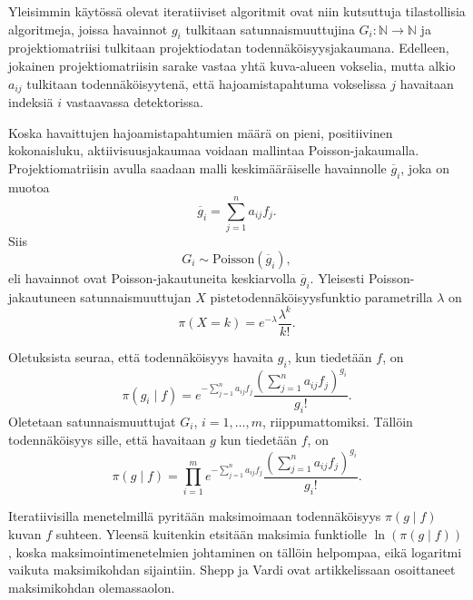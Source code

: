 Yleisimmin käytössä olevat iteratiiviset algoritmit ovat niin kutsuttuja tilastollisia algoritmeja, joissa havainnot $g_i$ tulkitaan satunnaismuuttujina $G_i\colon\mathbb{N}\to\mathbb{N}$\cite{wettenhovi_omegaopen-source_2021, kaipio_statistical_2005} ja projektiomatriisi tulkitaan projektiodatan todennäköisyysjakaumana\cite{boudjelal_novel_2021}. Edelleen, jokainen projektiomatriisin sarake vastaa yhtä kuva-alueen vokselia, mutta alkio $a_{ij}$ tulkitaan todennäköisyytenä, että hajoamistapahtuma vokselissa $j$ havaitaan indeksiä $i$ vastaavassa detektorissa\cite{boudjelal_novel_2021}.

Koska havaittujen hajoamistapahtumien määrä on pieni, positiivinen kokonaisluku, aktiivisuusjakaumaa voidaan mallintaa Poisson-jakaumalla\cite{kaipio_statistical_2005}. Projektiomatriisin avulla saadaan malli keskimääräiselle havainnolle $\overline{g}_i$, joka on muotoa\cite{boudjelal_novel_2021, shepp_maximum_1982}
\begin{equation*}
    \overline{g}_i=\sum_{j=1}^{n}a_{ij}f_j.
\end{equation*}
Siis
\begin{equation*}
    G_i\sim\text{Poisson}(\overline{g}_i),
\end{equation*}
eli havainnot ovat Poisson-jakautuneita keskiarvolla $\overline{g}_i$\cite{kaipio_statistical_2005, bruyant_analytic_2002, wettenhovi_transmission_2021}. Yleisesti Poisson-jakautuneen satunnaismuuttujan $X$ pistetodennäköisyysfunktio parametrilla $\lambda$ on
\begin{equation*}
    \pi(X=k)=e^{-\lambda}\frac{\lambda^{k}}{k!}.
\end{equation*}

Oletuksista seuraa, että todennäköisyys havaita $g_i$, kun tiedetään $f$, on
\begin{equation*}
    \pi(g_i \mid f)=e^{-\sum_{j=1}^{n}a_{ij}f_j}\frac{\left( \sum_{j=1}^{n}a_{ij}f_j \right)^{g_i}}{g_i!}.
\end{equation*}
Oletetaan satunnaismuuttujat $G_i$, $i=1,\ldots, m$, riippumattomiksi. Tällöin todennäköisyys sille, että havaitaan $g$ kun tiedetään $f$, on
\begin{equation*}
    \pi(g\mid f)=\prod_{i=1}^{m}e^{-\sum_{j=1}^{n}a_{ij}f_j}\frac{\left( \sum_{j=1}^{n}a_{ij}f_j \right)^{g_i}}{g_i!}.
\end{equation*}

Iteratiivisilla menetelmillä pyritään maksimoimaan todennäköisyys $\pi(g\mid f)$ kuvan $f$ suhteen. Yleensä kuitenkin etsitään maksimia funktiolle $\ln(\pi(g\mid f))$, koska maksimointimenetelmien johtaminen on tällöin helpompaa, eikä logaritmi vaikuta maksimikohdan sijaintiin. Shepp ja Vardi ovat artikkelissaan\cite{shepp_maximum_1982} osoittaneet maksimikohdan olemassaolon.

